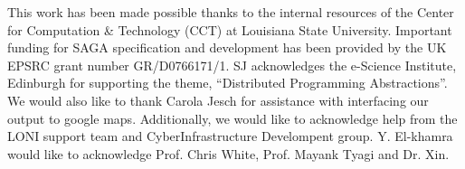 \documentclass[conference,final]{IEEEtran}
\begin{document}
This work has been made possible thanks to the internal resources of
the Center for Computation \& Technology (CCT) at Louisiana State
University.  Important funding for SAGA specification and development
has been provided by the UK EPSRC grant number GR/D0766171/1.  SJ
acknowledges the e-Science Institute, Edinburgh for supporting the
theme, ``Distributed Programming Abstractions''. We would also like to thank Carola Jesch for assistance with
interfacing our output to google maps. Additionally, we would like to
acknowledge help from the LONI support team and CyberInfrastructure
Develompent group.  Y. El-khamra would like to acknowledge Prof. Chris
White, Prof. Mayank Tyagi and Dr. Xin.



\end{document}
